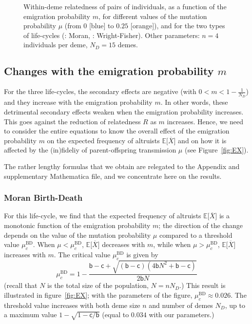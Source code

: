 \documentclass[11pt, letterpaper]{article}
\newcommand{\Esp}[1]{\mathbb{E}\big[ #1\big]}%
\newcommand{\appname}[0]{Appendix}
\newcommand{\bb}{\mathsf{b}}
\newcommand{\cc}{\mathsf{c}}
\newcommand{\BD}{\textrm{BD}}
\newcommand{\ndemes}{N_D}
\begin{document}
\begin{figure}[h]
\begin{tabular}{cc}
\end{tabular}
\caption{Within-deme relatedness of pairs of individuals, as a function of the emigration probability $m$, for different values of the mutation probability $\mu$ (from $0$ [blue] to $0.25$ [orange]), and for the two types of life-cycles (: Moran, : Wright-Fisher). Other parameters: $n=4$ individuals per deme, $\ndemes = 15$ demes.}
\label{fig:R}
\end{figure}

\subsection{Changes with the emigration probability $m$} 

For the three life-cycles, the secondary effects are negative (with $0<m< 1- \frac{1}{\ndemes}$) and they increase with the emigration probability $m$. In other words, these detrimental secondary effects weaken when the emigration probability increases. This goes against the reduction of relatedness $R$ as $m$ increases. Hence, we need to consider the entire equations to know the overall effect of the emigration probability $m$ on the expected frequency of altruists $\Esp{\overline{X}}$ and on how it is affected by the (in)fideliy of parent-offspring transmission $\mu$ (see Figure~\ref{fig:EX}). 
 
The rather lengthy formulas that we obtain are relegated to the \appname{} and supplementary Mathematica file, and we concentrate here on the results. 

\subsubsection{Moran Birth-Death}

For this life-cycle, we find that the expected frequency of altruists $\Esp{\overline{X}}$ is a monotonic function of the emigration probability $m$; the direction of the change depends on the value of the mutation probability $\mu$ compared to a threshold value $\mu_c^{\BD}$. When $\mu<\mu_c^{\BD}$, $\Esp{\overline{X}}$ decreases with $m$, while when $\mu>\mu_c^{\BD}$, $\Esp{\overline{X}}$  increases with $m$. The critical value $\mu_c^{\BD}$ is given by 
\begin{equation}\label{eq:mucBD}
\mu_c^{\BD} = %
1 - \frac{\bb  - \cc + \sqrt{(\bb - \cc) \left(4 \bb N^2 + \bb - \cc \right)} }{2 \bb N}
\end{equation}
%
(recall that $N$ is the total size of the population, $N=n \ndemes$.) This result is illustrated in figure~\ref{fig:EX}; with the parameters of the figure, $\mu_c^{\BD} \approx 0.026$. The threshold value increases with both deme size $n$ and number of demes $\ndemes$, up to a maximum value $1 - \sqrt{1-\cc/\bb}$ (equal to $0.034$ with our parameters.)
\end{document}
